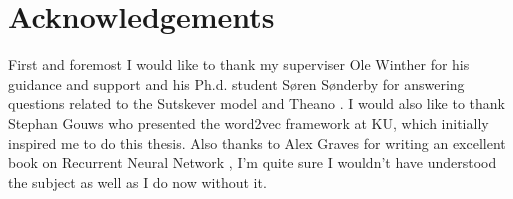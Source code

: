 \chapter{Acknowledgements}

First and foremost I would like to thank my superviser Ole Winther for his guidance and support and his Ph.d. student Søren Sønderby for answering questions related to the Sutskever model \cite[p.~1]{sutskever} and Theano \cite{theano-a, theano-b}. I would also like to thank Stephan Gouws who presented the word2vec framework \cite{word2vec-comparing, word2vec-details} at KU, which initially inspired me to do this thesis. Also thanks to Alex Graves for writing an excellent book on Recurrent Neural Network \cite{alexgraves}, I'm quite sure I wouldn't have understood the subject as well as I do now without it.
